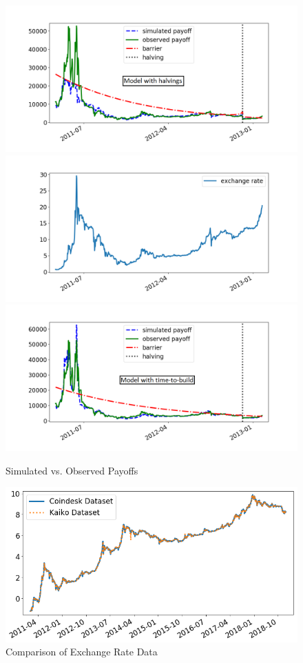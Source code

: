 \documentclass[12pt, a4paper]{article}
\begin{document}
\begin{figure}[H]
\caption{Simulated vs. Observed Payoffs}
\label{fig:payoffs_p1}\centering
\includegraphics[scale=0.48]{images/P_P_sim_hf_1_wide.png}
\includegraphics[scale=0.50]{images/cours1_wide.png}
\includegraphics[scale=0.48]{images/P_P_sim_delay_1_wide.png}
\end{figure}


\begin{figure}[H]
\centering
\caption{Comparison of Exchange Rate Data}
\label{fig:Kaiko_exchange_rate}
\includegraphics[scale=0.55]{images/Kaiko_exchange_rate}
\end{figure}
\end{document}
